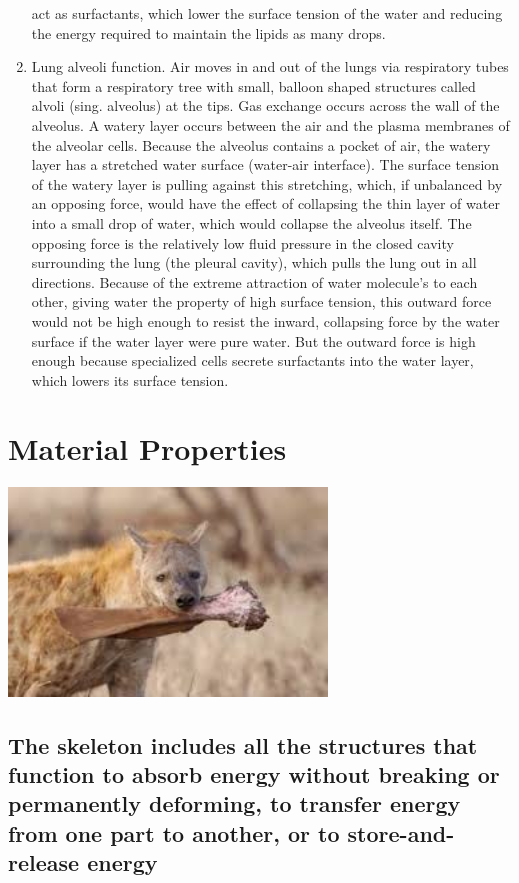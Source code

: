 \documentclass[]{book}
\begin{document}
\begin{enumerate}
  act as surfactants, which lower the surface tension of the water and
  reducing the energy required to maintain the lipids as many drops.
\item
  Lung alveoli function. Air moves in and out of the lungs via
  respiratory tubes that form a respiratory tree with small, balloon
  shaped structures called alvoli (sing. alveolus) at the tips. Gas
  exchange occurs across the wall of the alveolus. A watery layer occurs
  between the air and the plasma membranes of the alveolar cells.
  Because the alveolus contains a pocket of air, the watery layer has a
  stretched water surface (water-air interface). The surface tension of
  the watery layer is pulling against this stretching, which, if
  unbalanced by an opposing force, would have the effect of collapsing
  the thin layer of water into a small drop of water, which would
  collapse the alveolus itself. The opposing force is the relatively low
  fluid pressure in the closed cavity surrounding the lung (the pleural
  cavity), which pulls the lung out in all directions. Because of the
  extreme attraction of water molecule's to each other, giving water the
  property of high surface tension, this outward force would not be high
  enough to resist the inward, collapsing force by the water surface if
  the water layer were pure water. But the outward force is high enough
  because specialized cells secrete surfactants into the water layer,
  which lowers its surface tension.
\end{enumerate}

\chapter{Material Properties}\label{material-properties}

\includegraphics[width=3.33in]{images/materials_chapter/hyena}

\section{The skeleton includes all the structures that function to
absorb energy without breaking or permanently deforming, to transfer
energy from one part to another, or to store-and-release
energy}\label{the-skeleton-includes-all-the-structures-that-function-to-absorb-energy-without-breaking-or-permanently-deforming-to-transfer-energy-from-one-part-to-another-or-to-store-and-release-energy}
\end{document}
